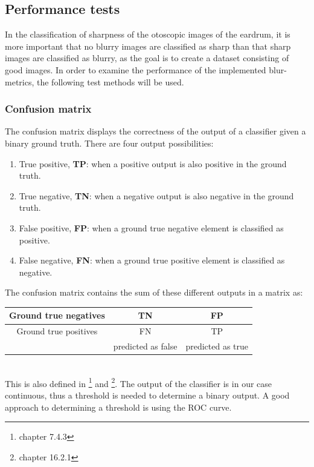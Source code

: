 \subsection{Performance tests}\label{Performance tests}
In the classification of sharpness of the otoscopic images of the eardrum, it is more important that no blurry images are classified as sharp than that sharp images are classified as blurry, as the goal is to create a dataset consisting of good images. In order to examine the performance of the implemented blur-metrics, the following test methods will be used.

\subsubsection{Confusion matrix}
The confusion matrix displays the correctness of the output of a classifier given a binary ground truth. There are four output possibilities: 
\begin{enumerate}
    \item True positive, \textbf{TP}: when a positive output is also positive in the ground truth.
    \item True negative, \textbf{TN}: when a negative output is also negative in the ground truth.
    \item False positive, \textbf{FP}: when a ground true negative element is classified as positive.
    \item False negative, \textbf{FN}: when a ground true positive element is classified as negative.
\end{enumerate}
The confusion matrix contains the sum of these different outputs in a matrix as:
\begin{table}[h!]\begin{tabular}{|c||c|c|}\hline
Ground true negatives & TN & FP\\\hline
Ground true positives & FN & TP\\\hline\hline
& predicted as false & predicted as true\\\hline
\end{tabular}\end{table}\\
This is also defined in \cite{img_analysis}\footnote{chapter 7.4.3} and \cite{ML_book}\footnote{chapter 16.2.1}. The output of the classifier is in our case continuous, thus a threshold is needed to determine a binary output. A good approach to determining a threshold is using the ROC curve.


